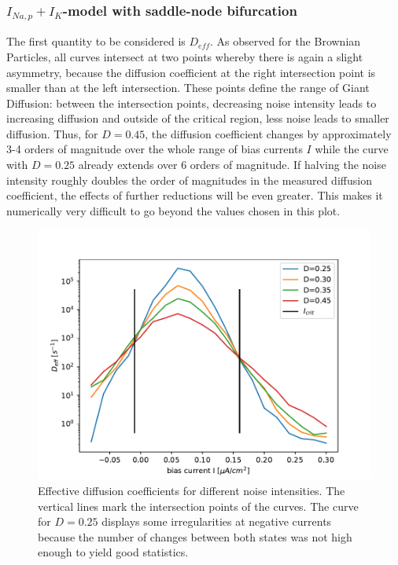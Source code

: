 \documentclass[12pt,a4paper]{article}
\begin{document}
\subsubsection{$I_{Na,p}+I_K$-model with saddle-node bifurcation}
The first quantity to be considered is $D_{eff}$.
As observed for the Brownian Particles, all curves intersect at two points whereby there is again a slight asymmetry, because the diffusion coefficient at the right intersection point is smaller than at the left intersection. These points define the range of Giant Diffusion: between the intersection points, decreasing noise intensity leads to increasing diffusion and outside of the critical region, less noise leads to smaller diffusion. Thus, for $D=0.45$, the diffusion coefficient changes by approximately 3-4 orders of magnitude over the whole range of bias currents $I$ while the curve with $D=0.25$ already extends over 6 orders of magnitude. If halving the noise intensity roughly doubles the order of magnitudes in the measured diffusion coefficient, the effects of further reductions will be even greater. This makes it numerically very difficult to go beyond the values chosen in this plot.
\begin{figure}[H]
	\centering
	\includegraphics[scale=1]{dneur25critsprealfast16alcoarsewstfrealfast9acoarsetf.pdf}\caption{Effective diffusion coefficients for different noise intensities. The vertical lines mark the intersection points of the curves. The curve for $D=0.25$ displays some irregularities at negative currents because the number of changes between both states was not high enough to yield good statistics.}
	\label{deff}
\end{figure}
\end{document}
